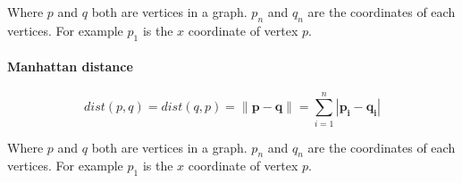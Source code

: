   Where $p$ and $q$ both are vertices in a graph. $p_{n}$ and $q_{n}$ are the coordinates of each vertices. For example $p_{1}$ is the $x$ coordinate of vertex $p$.

    \paragraph{Manhattan distance}\cite{wiki_manhattan_distance}

  \[
    dist(p, q) = dist(q, p) = \| \mathbf{p} - \mathbf{q} \| = \sum\limits_{i=1}^n | \mathbf{p_{i}} - \mathbf{q_{i}} |
  \]

  Where $p$ and $q$ both are vertices in a graph. $p_{n}$ and $q_{n}$ are the coordinates of each vertices. For example $p_{1}$ is the $x$ coordinate of vertex $p$.



